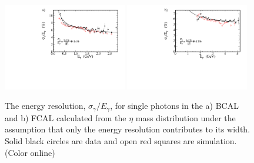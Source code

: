 \begin{figure}[tbh]\centering
\includegraphics[width=0.48\textwidth]{figures/fit_BCAL_energy_resolution_sigma.pdf} \includegraphics[width=0.48\textwidth]{figures/fit_FCAL_energy_resolution_sigma.pdf}
\caption{\label{fig:bcal:eta_resolution} 
The energy resolution, $\sigma_\gamma/E_\gamma$, for single photons in the a) BCAL and b) FCAL calculated from the $\eta$ mass distribution under the assumption that only the energy resolution contributes to its width.  Solid black circles are data and open red squares are simulation.
(Color online)
 }
\end{figure}    


